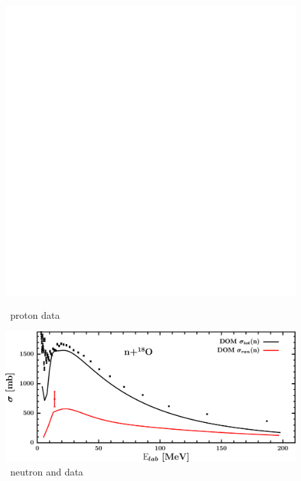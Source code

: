 \begin{figure}[H]
    \centering
    \begin{minipage}{0.45\textwidth}
        \centering
        \includegraphics[width=1.0\textwidth]{figures/o18_protonInelastic.png}
        \caption{\oEight\ proton \rxn data}
        \label{DOMFitData_o18_proton_inelastic}
    \end{minipage}\hfill
    \begin{minipage}{0.45\textwidth}
        \centering
        \includegraphics[width=1.0\textwidth]{figures/o18_neutronInelastic.png}
        \caption{\oEight\ neutron \rxn and \tot data}
        \label{DOMFitData_o18_neutron_inelastic}
    \end{minipage}
\end{figure}

